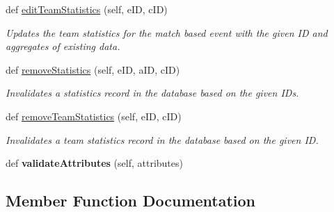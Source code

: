 \begin{DoxyCompactItemize}
\item 
def \hyperlink{classhandler_1_1match__based__event_1_1_match_based_event_handler_a0c2916ba9a415c8e3ddaae36a69e6e33}{edit\+Team\+Statistics} (self, e\+ID, c\+ID)
\begin{DoxyCompactList}\small\item\em Updates the team statistics for the match based event with the given ID and aggregates of existing data. \end{DoxyCompactList}\item 
def \hyperlink{classhandler_1_1match__based__event_1_1_match_based_event_handler_abc2931afa97bddacd2ef59b1f3542b56}{remove\+Statistics} (self, e\+ID, a\+ID, c\+ID)
\begin{DoxyCompactList}\small\item\em Invalidates a statistics record in the database based on the given I\+Ds. \end{DoxyCompactList}\item 
def \hyperlink{classhandler_1_1match__based__event_1_1_match_based_event_handler_a6a87e48bd0dd3fe4b070f81c435adad0}{remove\+Team\+Statistics} (self, e\+ID, c\+ID)
\begin{DoxyCompactList}\small\item\em Invalidates a team statistics record in the database based on the given ID. \end{DoxyCompactList}\item 
\mbox{\label{classhandler_1_1match__based__event_1_1_match_based_event_handler_ac99382e4135734a5495b5366994f267c}} 
def {\bfseries validate\+Attributes} (self, attributes)
\end{DoxyCompactItemize}


\subsection{Member Function Documentation}
\mbox{\label{classhandler_1_1match__based__event_1_1_match_based_event_handler_a3db2c77ecdd1260e4f38eb1f1851312d}} 

